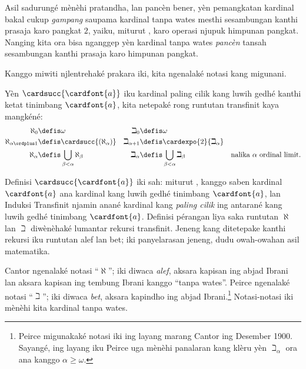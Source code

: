 \documentclass[../../../include/open-logic-section]{subfiles}
\begin{document}


Asil sadurungé mènèhi pratandha, lan pancèn bener, yèn pemangkatan
kardinal bakal cukup \emph{gampang} saupama kardinal tanpa wates mesthi
sesambungan kanthi prasaja karo pangkat $2$, yaiku, miturut
, karo operasi njupuk himpunan pangkat.
Nanging kita ora bisa nganggep yèn kardinal tanpa wates \emph{pancèn} tansah
sesambungan kanthi prasaja karo himpunan pangkat.

Kanggo miwiti njlentrehaké prakara iki, kita ngenalaké notasi kang migunani.

\begin{defn}
Yèn $\cardsucc{\cardfont{a}}$ iku kardinal paling cilik kang luwih gedhé
kanthi ketat tinimbang $\cardfont{a}$, kita netepaké rong runtutan
transfinit kaya mangkéné:
\begin{align*}
	\aleph_{0} &\defis \omega & 		
	\beth_{0} &\defis \omega\\
	\aleph_{\alpha \ordplus 1} &\defis \cardsucc{(\aleph_{\alpha})} &
	\beth_{\alpha+1} &\defis \cardexpo{2}{\beth_{\alpha}}\\
	\aleph_{\alpha} &\defis \bigcup_{\beta< \alpha} \aleph_{\beta} &
	\beth_{\alpha} &\defis \bigcup_{\beta < \alpha}\beth_{\beta} & \text{nalika $\alpha$ ordinal limit}.
	\end{align*}
\end{defn}

Definisi $\cardsucc{\cardfont{a}}$ iki sah: miturut
, kanggo saben
kardinal $\cardfont{a}$ ana kardinal kang luwih gedhé tinimbang
$\cardfont{a}$, lan Induksi Transfinit njamin anané kardinal kang
\emph{paling cilik} ing antarané kang luwih gedhé tinimbang
$\cardfont{a}$.
Definisi pérangan liya saka runtutan $\aleph$ lan $\beth$ diwènèhaké
lumantar rekursi transfinit.
Jeneng kang ditetepake kanthi rekursi iku runtutan alef lan bet; iki panyelarasan jeneng, dudu owah-owahan asil matematika.

Cantor ngenalaké notasi ``$\aleph$''; iki diwaca \emph{alef}, aksara
kapisan ing abjad Ibrani lan aksara kapisan ing tembung Ibrani kanggo
``tanpa wates''. Peirce ngenalaké notasi ``$\beth$''; iki diwaca
\emph{bet}, aksara kapindho ing abjad Ibrani.\footnote{Peirce migunakaké
notasi iki ing layang marang Cantor ing Desember 1900. Sayangé, ing
layang iku Peirce uga mènèhi panalaran kang klèru yèn $\beth_\alpha$
ora ana kanggo $\alpha \geq \omega$.} Notasi-notasi iki mènèhi kita
kardinal tanpa wates.
\end{document}

